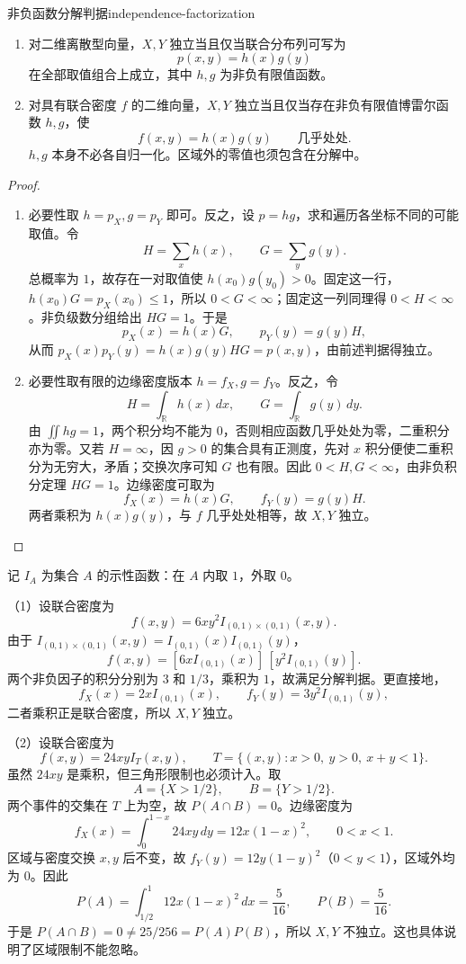 \begin{proposition}{非负函数分解判据}{independence-factorization}
\begin{enumerate}
\item 对二维离散型向量，$X,Y$ 独立当且仅当联合分布列可写为
\[
p(x,y)=h(x)g(y)
\]
在全部取值组合上成立，其中 $h,g$ 为非负有限值函数。
\item 对具有联合密度 $f$ 的二维向量，$X,Y$ 独立当且仅当存在非负有限值博雷尔函数 $h,g$，使
\[
f(x,y)=h(x)g(y)\qquad\text{几乎处处}.
\]
$h,g$ 本身不必各自归一化。区域外的零值也须包含在分解中。
\end{enumerate}
\end{proposition}

\begin{proof}
\begin{enumerate}
\item 必要性取 $h=p_X,g=p_Y$ 即可。反之，设 $p=hg$，求和遍历各坐标不同的可能取值。令
\[
H=\sum_xh(x),\qquad G=\sum_yg(y).
\]
总概率为 $1$，故存在一对取值使 $h(x_0)g(y_0)>0$。固定这一行，$h(x_0)G=p_X(x_0)\leq1$，所以 $0<G<\infty$；固定这一列同理得 $0<H<\infty$。非负级数分组给出 $HG=1$。于是
\[
p_X(x)=h(x)G,\qquad p_Y(y)=g(y)H,
\]
从而 $p_X(x)p_Y(y)=h(x)g(y)HG=p(x,y)$，由前述判据得独立。

\item
必要性取有限的边缘密度版本 $h=f_X,g=f_Y$。反之，令
\[
H=\int_{\mathbb R}h(x)\,dx,\qquad
G=\int_{\mathbb R}g(y)\,dy.
\]
由 $\iint hg=1$，两个积分均不能为 $0$，否则相应函数几乎处处为零，二重积分亦为零。又若 $H=\infty$，因 $g>0$ 的集合具有正测度，先对 $x$ 积分便使二重积分为无穷大，矛盾；交换次序可知 $G$ 也有限。因此 $0<H,G<\infty$，由非负积分定理 $HG=1$。边缘密度可取为
\[
f_X(x)=h(x)G,\qquad f_Y(y)=g(y)H.
\]
两者乘积为 $h(x)g(y)$，与 $f$ 几乎处处相等，故 $X,Y$ 独立。
\end{enumerate}
\end{proof}

\begin{example}[乘积区域与三角形区域中的独立性]
记 $I_A$ 为集合 $A$ 的示性函数：在 $A$ 内取 $1$，外取 $0$。

（1）设联合密度为
\[
f(x,y)=6xy^2 I_{(0,1)\times(0,1)}(x,y).
\]
由于 $I_{(0,1)\times(0,1)}(x,y)=I_{(0,1)}(x)I_{(0,1)}(y)$，
\[
f(x,y)=[6xI_{(0,1)}(x)]\,[y^2I_{(0,1)}(y)].
\]
两个非负因子的积分分别为 $3$ 和 $1/3$，乘积为 $1$，故满足分解判据。更直接地，
\[
f_X(x)=2xI_{(0,1)}(x),\qquad
f_Y(y)=3y^2I_{(0,1)}(y),
\]
二者乘积正是联合密度，所以 $X,Y$ 独立。

（2）设联合密度为
\[
f(x,y)=24xyI_T(x,y),\qquad
T=\{(x,y):x>0,\ y>0,\ x+y<1\}.
\]
虽然 $24xy$ 是乘积，但三角形限制也必须计入。取
\[
A=\{X>1/2\},\qquad B=\{Y>1/2\}.
\]
两个事件的交集在 $T$ 上为空，故 $P(A\cap B)=0$。边缘密度为
\[
f_X(x)=\int_0^{1-x}24xy\,dy=12x(1-x)^2,\qquad 0<x<1.
\]
区域与密度交换 $x,y$ 后不变，故 $f_Y(y)=12y(1-y)^2$（$0<y<1$），区域外均为 $0$。因此
\[
P(A)=\int_{1/2}^1 12x(1-x)^2\,dx=\frac5{16},
\qquad P(B)=\frac5{16}.
\]
于是 $P(A\cap B)=0\ne25/256=P(A)P(B)$，所以 $X,Y$ 不独立。这也具体说明了区域限制不能忽略。
\end{example}

